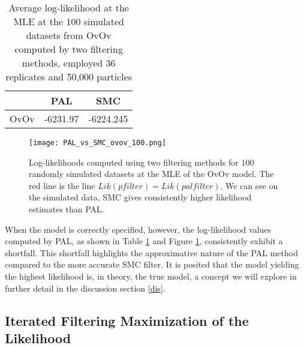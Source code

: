\documentclass[10pt]{article}
\begin{document}
\begin{table}[htbp] %
\centering %
\caption{Average log-likelihood at the MLE at the 100 simulated datasets from OvOv computed by two filtering methods, employed 36 replicates and 50,000 particles} %
\label{tab:ovovtrue} %
\begin{tabular}{|c c c|} 
 \hline
  & PAL & SMC  \\ 
 \hline
 OvOv & -6231.97 & -6224.245 \\ 
 \hline
\end{tabular}
\end{table}
\begin{figure}[H]
\centering
\vspace{-7mm}
\texttt{[image: PAL\_vs\_SMC\_ovov\_100.png]}
\caption{\label{fig:PAL_vs_SMC_ovov_100}Log-likelihoods computed using two filtering methods for 100 randomly simulated datasets at the MLE of the OvOv model. The red line is the line $Lik(pfilter)=Lik(palfilter)$. We can see on the simulated data, SMC gives consistently higher likelihood estimates than PAL.}
\end{figure}



When the model is correctly specified, however, the log-likelihood values computed by PAL, as shown in Table \ref{tab:ovovtrue} and Figure \ref{fig:PAL_vs_SMC_ovov_100}, consistently exhibit a shortfall. This shortfall highlights the approximative nature of the PAL method compared to the more accurate SMC filter. It is posited that the model yielding the highest likelihood is, in theory, the true model, a concept we will explore in further detail in the discussion section \ref{dis}.

\subsection{Iterated Filtering Maximization of the Likelihood}
\end{document}
